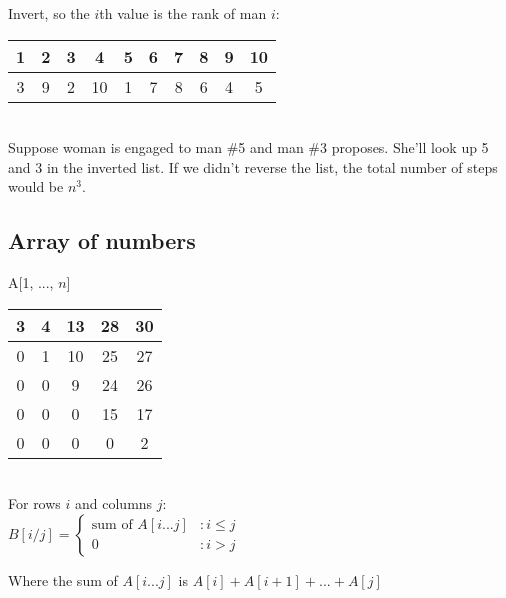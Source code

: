 Invert, so the $i$th value is the rank of man $i$:\\
\begin{tabular}{ c c c c c c c c c c }
1 & 2 & 3 & 4 & 5 & 6 & 7 & 8 & 9 & 10 \\ \hline
\multicolumn{1}{|c|}{3} & \multicolumn{1}{|c|}{9} & \multicolumn{1}{|c|}{2} & \multicolumn{1}{|c|}{10} & \multicolumn{1}{|c|}{1} & \multicolumn{1}{|c|}{7} & \multicolumn{1}{|c|}{8} & \multicolumn{1}{|c|}{6} & \multicolumn{1}{|c|}{4} & \multicolumn{1}{|c|}{5} \\ \hline
\end{tabular}\\

Suppose woman is engaged to man \#5 and man \#3 proposes. She'll look up 5 and 3 in the inverted list. If we didn't reverse the list, the total number of steps would be $n^3$.

\subsection{Array of numbers}
A[1, ..., $n$]\\

\begin{tabular}{|c|c|c|c|c|}
\hline
3 & 4 & 13 & 28 & 30 \\ \hline
0 & 1 & 10 & 25 & 27 \\ \hline
0 & 0 & 9 & 24 & 26 \\ \hline
0 & 0 & 0 & 15 & 17 \\ \hline
0 & 0 & 0 & 0 & 2 \\ \hline
\end{tabular}\\

For rows $i$ and columns $j$:\\
$B[i/j] = \left\{
\begin{array}{lr}
\mbox{sum of } A[i...j] & : i \leq j\\
0 & : i > j \end{array}
\right.$

Where the sum of $A[i ... j]$ is $A[i] + A[i+1] + ... + A[j]$
\newpage
\begin{algorithmic}[1]
\EndFor
{}
\EndFor
\EndFor
\end{algorithmic}

